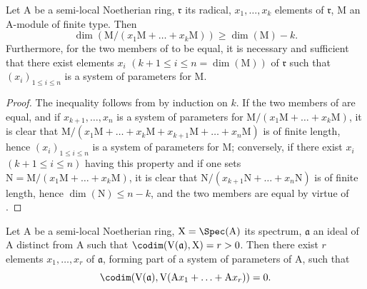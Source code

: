 \begin{proposition}[16.3.7]
\label{0.16.3.7}
Let $\mathrm{A}$ be a semi-local Noetherian ring, $\mathfrak{r}$ its radical, $x_1,\ldots,x_k$ elements of $\mathfrak{r}$, $\mathrm{M}$ an $\mathrm{A}$-module of finite type.
Then
\begin{equation}
\label{0.16.3.7.1}
\tag{16.3.7.1}
  \dim(\mathrm{M}/(x_1\mathrm{M}+\ldots+x_k\mathrm{M}))\geq\dim(\mathrm{M})-k.
\end{equation}
Furthermore, for the two members of  to be equal, it is necessary and sufficient that there exist elements $x_i$ $(k+1\leq i\leq n=\dim(\mathrm{M}))$ of $\mathfrak{r}$ such that $(x_i)_{1\leq i\leq n}$ is a system of parameters for $\mathrm{M}$.
\end{proposition}

\begin{proof}
The inequality  follows from  by induction on $k$.
If the two members of  are equal, and if $x_{k+1},\ldots,x_n$ is a system of parameters for $\mathrm{M}/(x_1\mathrm{M}+\ldots+x_k\mathrm{M})$, it is clear that $\mathrm{M}/(x_1\mathrm{M}+\ldots+x_k\mathrm{M}+x_{k+1}\mathrm{M}+\ldots+x_n\mathrm{M})$ is of finite length, hence $(x_i)_{1\leq i\leq n}$ is a system of parameters for $\mathrm{M}$; conversely, if there exist $x_i$ $(k+1\leq i\leq n)$ having this property and if one sets $\mathrm{N}=\mathrm{M}/(x_1\mathrm{M}+\ldots+x_k\mathrm{M})$, it is clear that $\mathrm{N}/(x_{k+1}\mathrm{N}+\ldots+x_n\mathrm{N})$ is of finite length, hence $\dim(\mathrm{N})\leq n-k$, and the two members are equal by virtue of .
\end{proof}


\begin{proposition}[16.3.8]
\label{0.16.3.8}
Let $\mathrm{A}$ be a semi-local Noetherian ring, $\mathrm{X}=\Spec(\mathrm{A})$ its spectrum, $\mathfrak{a}$ an ideal of $\mathrm{A}$ distinct from $\mathrm{A}$ such that $\codim(\mathrm{V}(\mathfrak{a}),\mathrm{X})=r>0$.
Then there exist $r$ elements $x_1,\ldots,x_r$ of $\mathfrak{a}$, forming part of a system of parameters of $\mathrm{A}$, such that
\[
  \codim(\mathrm{V}(\mathfrak{a}),\mathrm{V}(\mathrm{A}x_1+\ldots+\mathrm{A}x_r))=0.
\]
\end{proposition}

